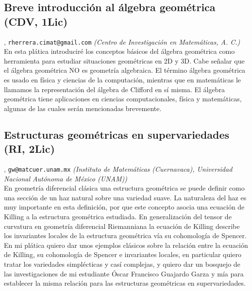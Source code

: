 \subsection{\sffamily Breve introducci\'on al \'algebra geom\'etrica {\footnotesize (CDV, 1Lic)}} \label{reg-379} 
, {\tt rherrera.cimat@gmail.com}  {\slshape (Centro de Investigaci\'on en Matem\'aticas, A. C.)}\\
          \noindent En esta pl\'atica introducir\'e los conceptos b\'asicos del \'algebra geom\'etrica como herramienta para estudiar situaciones geom\'etricas en 2D y 3D. Cabe se\~nalar que el \'algebra geom\'etrica NO es geometr\'ia algebraica. El t\'ermino \'algebra geom\'etrica es usado en f\'isica y ciencias de la computaci\'on, mientras que en matem\'aticas le llamamos la representaci\'on del \'algebra de Clifford en s\'i misma. El \'algebra geom\'etrica tiene aplicaciones en ciencias computacionales, f\'isica y matem\'aticas, algunas de las cuales ser\'an mencionadas brevemente.
\subsection{\sffamily Estructuras geom\'etricas en supervariedades {\footnotesize (RI, 2Lic)}} \label{reg-840} 
, {\tt gw@matcuer.unam.mx}  {\slshape (Instituto de Matem\'aticas (Cuernavaca), Universidad Nacional Aut\'onoma de M\'exico (UNAM))}\\
          \noindent En geometr\'ia diferencial cl\'asica una estructura geom\'etrica se puede definir como una secci\'on de un haz natural sobre una variedad suave. La naturaleza del haz es muy importante en esta definici\'on, por que este concepto asocia una ecuaci\'on de Killing a la estructura geom\'etrica estudiada. En generalizaci\'on del tensor de curvatura en geometr\'ia diferencial Riemanniana la ecuaci\'on de Killing describe los invariantes locales de la estructura geom\'etrica v\'ia su cohomolog\'ia de Spencer. En mi pl\'atica quiero dar unos ejemplos cl\'asicos sobre la relaci\'on entre la ecuaci\'on de Killing, su cohomolog\'ia de Spencer e invariantes locales, en particular quiero tratar los variedades simpl\'ecticas y cas\'i complejas, y quiero dar un bosquejo de las investigaciones de mi estudiante \'Oscar Francisco Guajardo Garza y m\'ia para establecer la misma relaci\'on para las estructuras geom\'etricas en supervariedades.

